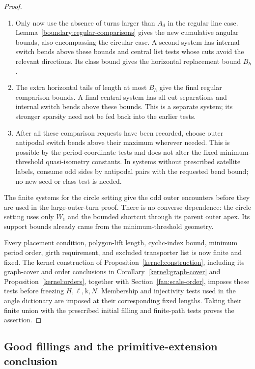 \begin{proof}
\begin{enumerate}[label=\textup{\arabic*.},leftmargin=*]
\item Only now use the absence of turns larger than $A_d$ in the regular
line case. Lemma~\ref{boundary:regular-comparisons} gives the new
cumulative angular bounds, also encompassing the circular case. A second
system has internal switch bends above these bounds and central list
tests whose cuts avoid the relevant directions. Its class bound gives
the horizontal replacement bound $B_h$.

\item The extra horizontal tails of length at most $B_h$ give the final
regular comparison bounds. A final central system has all cut separations
and internal switch bends above these bounds. This is a separate system;
its stronger sparsity need not be fed back into the earlier tests.

\item After all these comparison requests have been recorded, choose
outer antipodal switch bends above their maximum wherever needed. This
is possible by the period-coordinate tests and does not alter the fixed
minimum-threshold quasi-isometry constants. In systems without prescribed
satellite labels, consume odd sides by antipodal pairs with the requested
bend bound; no new seed or class test is needed.
\end{enumerate}

The finite systems for the circle setting give the odd outer encounters
before they are used in the large-outer-turn proof. There is no converse
dependence: the circle setting uses only $W_1$ and the bounded shortcut
through its parent outer apex. Its support bounds already came from the
minimum-threshold geometry.

Every placement condition, polygon-lift length, cyclic-index bound,
minimum period order, girth requirement, and excluded transporter list is
now finite and fixed. The kernel construction of
Proposition~\ref{kernel:construction}, including its graph-cover and order
conclusions in Corollary~\ref{kernel:graph-cover} and
Proposition~\ref{kernel:orders}, together with
Section~\ref{fan:scale-order}, imposes these tests before freezing
$H,\ell,\mathbb k,N$. Membership and injectivity tests used in the angle
dictionary are imposed at their corresponding fixed lengths. Taking their
finite union with the prescribed initial filling and finite-path tests
proves the assertion.
\end{proof}

\subsection{Good fillings and the primitive-extension conclusion}

